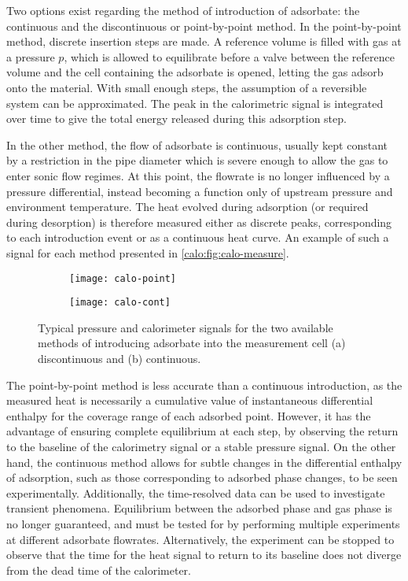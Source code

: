 Two options exist regarding the method of introduction of adsorbate:
the continuous and the discontinuous or point-by-point method. In
the point-by-point method, discrete insertion steps are made.
A reference volume is filled with gas at a pressure \(p\), which
is allowed to equilibrate before a valve between the reference volume
and the cell containing the adsorbate is opened, letting the
gas adsorb onto the material. With small enough steps, the
assumption of a reversible system can be approximated.
The peak in the calorimetric signal is integrated over time
to give the total energy released during this adsorption step.

In the other method, the flow of adsorbate is continuous, usually kept
constant by a restriction in the pipe diameter which is severe enough
to allow the gas to enter sonic flow regimes. At this point, the
flowrate is no longer influenced by a pressure differential,
instead becoming a function only of upstream pressure and environment
temperature.
The heat evolved during adsorption (or required during desorption)
is therefore measured either as discrete peaks, corresponding to
each introduction event or as a continuous heat curve. An example of such a signal
for each method presented in \autoref{calo:fig:calo-measure}.

\begin{figure}[htb]

	\centering
	\begin{subfigure}[b]{.5\textwidth}
		\centering
		\texttt{[image: calo-point]}
		\caption{}%
		\label{calo:fig:calo-point}
	\end{subfigure}
	\begin{subfigure}[b]{.48\textwidth}
		\centering
		\texttt{[image: calo-cont]}
		\caption{}%
		\label{calo:fig:calo-cont}
	\end{subfigure}%
	\caption{Typical pressure and calorimeter signals for the two
		available methods of introducing adsorbate into the measurement
		cell (a) discontinuous and (b) continuous.
	}%
	\label{calo:fig:calo-measure}

\end{figure}

The point-by-point method is less accurate than a continuous introduction,
as the measured heat is necessarily a cumulative value of instantaneous
differential enthalpy for the coverage range of each adsorbed point.
However, it has the advantage of ensuring complete equilibrium at
each step, by observing the return to the baseline of the calorimetry
signal or a stable pressure signal. On the other hand, the
continuous method allows for subtle changes in the differential enthalpy of
adsorption, such as those corresponding to adsorbed phase changes,
to be seen experimentally. Additionally, the time-resolved data
can be used to investigate transient phenomena. Equilibrium between
the adsorbed phase and gas phase is no longer guaranteed, and must be
tested for by performing multiple experiments at different adsorbate
flowrates. Alternatively, the experiment can be stopped to observe that the
time for the heat signal to return to its baseline does not diverge
from the dead time of the calorimeter.

